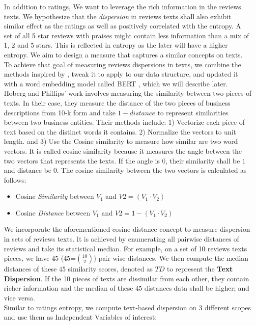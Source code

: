 \documentclass[msom,blindrev]{informs3}
\begin{document}
In addition to ratings, We want to leverage the rich information in the reviews texts. We hypothesize that the \textit{dispersion} in reviews texts shall also exhibit similar effect as the ratings as well as positively correlated with the entropy. A set of all 5 star reviews with praises might contain less information than a mix of 1, 2 and 5 stars. This is reflected in entropy as the later will have a higher entropy. We aim to design a measure that captures a similar concepts on texts. To achieve that goal of measuring reviews dispersions in texts,  we combine the methods inspired by \cite{hoberg2016text}, tweak it to apply to our data structure,  and updated it with a word embedding model called BERT , which we will describe later. \\
Hoberg and Phillips' work involves measuring the similarity between two pieces of texts. In their case, they measure the distance of the two pieces of business descriptions from 10-k form and take $1 - distance$ to represent similarities between two business entities. Their methods include: 1) Vectorize each piece of text based on the distinct words it contains. 2) Normalize the vectors to unit length. and 3) Use the Cosine similarity to measure how similar are two word vectors. It is called cosine similarity because it measures the angle between the two vectors that represents the texts. If the angle is $0$, their similarity shall be $1$ and distance be $0$. The cosine similarity between the two vectors is calculated as follows: \\
\begin{itemize}
\item Cosine \textit{Similarity} between $V_{1}$ and $V{2} =(V_1 \cdot V_2)$
\item Cosine \textit{Distance} between $V_{1}$ and $V{2}=1-(V_1 \cdot V_2)$
\end{itemize}
We incorporate the aforementioned cosine distance concept to measure dispersion in sets of reviews texts. It is achieved by enumerating all pairwise distances of reviews and take its statistical median. For example, on a set of 10 reviews texts pieces, we have 45 (45=$\binom{10}{2}$) pair-wise distances.  We then compute the median distances of these 45 similarity scores, denoted as $TD$ to represent the \textbf{Text Dispersion}. If the 10 pieces of texts are dissimilar from each other, they contain richer information and the median of these $45$ distances data shall be higher; and vice versa.  \\
Similar to ratings entropy, we compute text-based dispersion on 3 different scopes and use them as Independent Variables of interest: \\
\end{document}
